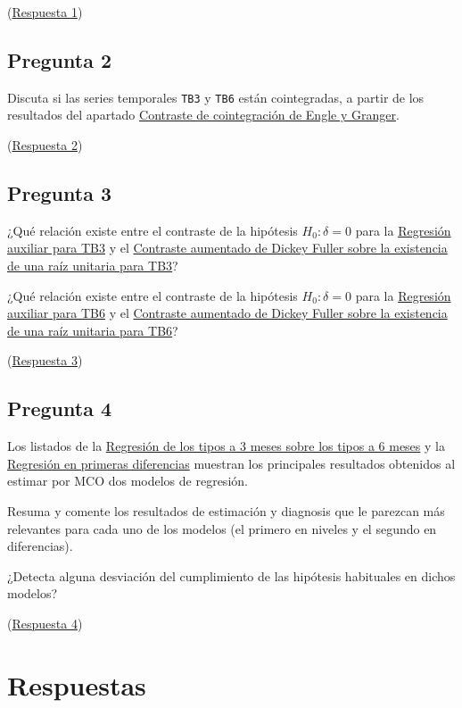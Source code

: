 \documentclass[10pt]{article}
\begin{document}
(\hyperref[sec:orgc24f3d4]{Respuesta 1})
\subsection*{Pregunta 2}
\label{sec:orge2c4c4a}

Discuta si las series temporales \texttt{TB3} y \texttt{TB6} están cointegradas, a
partir de los resultados del apartado \hyperref[sec:org17e476f]{Contraste de cointegración de Engle y Granger}.

(\hyperref[sec:org27b785e]{Respuesta 2})
\subsection*{Pregunta 3}
\label{sec:org107e533}

¿Qué relación existe entre el contraste de la hipótesis \(H_0: \delta =
0\) para la \hyperref[sec:org81eaa70]{Regresión auxiliar para TB3} y el \hyperref[sec:org3611544]{Contraste aumentado de Dickey Fuller sobre la existencia de una raíz unitaria para TB3}?

¿Qué relación existe entre el contraste de la hipótesis \(H_0: \delta =
0\) para la \hyperref[sec:org9dfd97f]{Regresión auxiliar para TB6} y el \hyperref[sec:org9274ddc]{Contraste aumentado de Dickey Fuller sobre la existencia de una raíz unitaria para TB6}?

(\hyperref[sec:orgee5b773]{Respuesta 3})
\subsection*{Pregunta 4}
\label{sec:orge9abf7a}

Los listados de la \hyperref[sec:org0c4e31d]{Regresión de los tipos a 3 meses sobre los tipos a 6 meses} y la \hyperref[sec:orgaad9f0b]{Regresión en primeras diferencias} muestran los
principales resultados obtenidos al estimar por MCO dos modelos de
regresión.

Resuma y comente los resultados de estimación y diagnosis que le
parezcan más relevantes para cada uno de los modelos (el primero en
niveles y el segundo en diferencias).

¿Detecta alguna desviación del cumplimiento de las hipótesis
habituales en dichos modelos?

(\hyperref[sec:org044d4ea]{Respuesta 4})

\newpage
\section*{Respuestas}
\label{sec:org47301d2}
\end{document}
